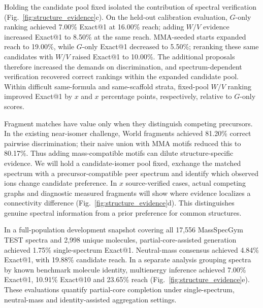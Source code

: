 \documentclass[11pt]{article}
\newcommand{\pending}[1]{\ensuremath{x}}
\begin{document}
Holding the candidate pool fixed isolated the contribution of spectral verification (Fig.~\ref{fig:structure_evidence}c). On the held-out calibration evaluation, \(G\)-only ranking achieved 7.00\% Exact@1 at 16.00\% reach; adding \(W/V\) evidence increased Exact@1 to 8.50\% at the same reach. MMA-seeded starts expanded reach to 19.00\%, while \(G\)-only Exact@1 decreased to 5.50\%; reranking these same candidates with \(W/V\) raised Exact@1 to 10.00\%. The additional proposals therefore increased the demands on discrimination, and spectrum-dependent verification recovered correct rankings within the expanded candidate pool. Within difficult same-formula and same-scaffold strata, fixed-pool \(W/V\) ranking improved Exact@1 by \(\pending{r2-01}\) and \(\pending{r2-02}\) percentage points, respectively, relative to \(G\)-only scores.

Fragment matches have value only when they distinguish competing precursors. In the existing near-isomer challenge, World fragments achieved 81.20\% correct pairwise discrimination; their naive union with MMA motifs reduced this to 80.17\%. Thus adding mass-compatible motifs can dilute structure-specific evidence. We will hold a candidate-isomer pool fixed, exchange the matched spectrum with a precursor-compatible peer spectrum and identify which observed ions change candidate preference. In \(\pending{r2-03}\) source-verified cases, actual competing graphs and diagnostic measured fragments will show where evidence localizes a connectivity difference (Fig.~\ref{fig:structure_evidence}d). This distinguishes genuine spectral information from a prior preference for common structures.

In a full-population development snapshot covering all 17,556 MassSpecGym TEST spectra and 2,998 unique molecules,\cite{MassSpecGym2024} partial-core-assisted generation achieved 1.75\% single-spectrum Exact@1. Neutral-mass consensus achieved 4.84\% Exact@1, with 19.88\% candidate reach. In a separate analysis grouping spectra by known benchmark molecule identity, multienergy inference achieved 7.00\% Exact@1, 10.91\% Exact@10 and 23.65\% reach (Fig.~\ref{fig:structure_evidence}e). These evaluations quantify partial-core completion under single-spectrum, neutral-mass and identity-assisted aggregation settings.
\end{document}
